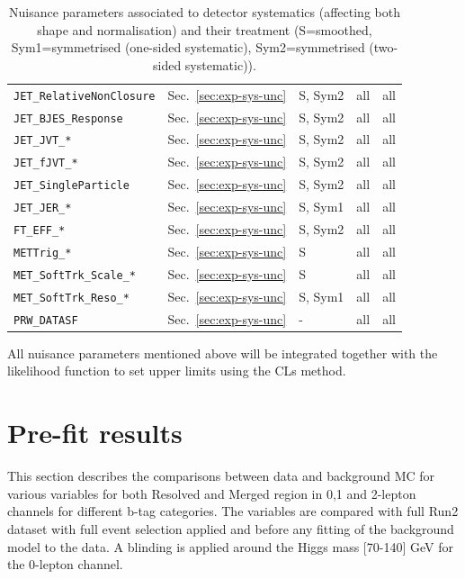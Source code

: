 \begin{table}[ht]
\begin{tabular}{|p{3.5cm}|p{2.0cm}|p{1.5cm}|p{2cm}|p{1.5cm}|}
        \texttt{JET\_RelativeNonClosure} & Sec.~\ref{sec:exp-sys-unc} & S, Sym2 & all & all \\
        \texttt{JET\_BJES\_Response} & Sec.~\ref{sec:exp-sys-unc} & S, Sym2 & all & all \\
        \texttt{JET\_JVT\_*} & Sec.~\ref{sec:exp-sys-unc} & S, Sym2 & all & all \\
        \texttt{JET\_fJVT\_*} & Sec.~\ref{sec:exp-sys-unc} & S, Sym2 & all & all \\
        \texttt{JET\_SingleParticle} & Sec.~\ref{sec:exp-sys-unc} & S, Sym2 & all & all \\
        \texttt{JET\_JER\_*} & Sec.~\ref{sec:exp-sys-unc} & S, Sym1 & all & all \\
        \texttt{FT\_EFF\_*} & Sec.~\ref{sec:exp-sys-unc} & S, Sym2 & all & all \\
        \texttt{METTrig\_*} & Sec.~\ref{sec:exp-sys-unc} & S & all & all \\
        \texttt{MET\_SoftTrk\_Scale\_*} & Sec.~\ref{sec:exp-sys-unc} & S & all & all \\
        \texttt{MET\_SoftTrk\_Reso\_*} & Sec.~\ref{sec:exp-sys-unc} & S, Sym1 & all & all \\
        \texttt{PRW\_DATASF} & Sec.~\ref{sec:exp-sys-unc} & - & all & all \\
        \hline
    \end{tabular}
    \caption{Nuisance parameters associated to detector systematics (affecting both shape and normalisation) and their treatment (S=smoothed, Sym1=symmetrised (one-sided systematic), Sym2=symmetrised (two-sided systematic)).}
    \label{tab:np-shape2}
\end{table}  

\par All nuisance parameters mentioned above will be integrated together with the likelihood function to set upper limits using the CLs method.
\section{Pre-fit results}

\par This section describes the comparisons between data and background MC for various variables for both
Resolved and Merged region in 0,1 and 2-lepton channels for different b-tag categories. The variables are
compared with full Run2 dataset with full event selection applied and before any fitting of the background
model to the data. A blinding is applied around the Higgs mass [70-140] GeV for the 0-lepton channel.

